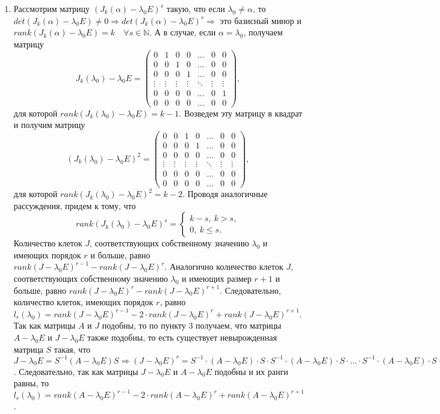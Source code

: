 \begin{Proof}
\begin{enumerate}
		\item Рассмотрим матрицу $(J_k(\alpha) - \lambda_0 E)^s$ такую, что если $\lambda_0 \ne \alpha$, то $det(J_k(\alpha) - \lambda_0 E)\ne 0 \Rightarrow det(J_k(\alpha) - \lambda_0 E)^s\Rightarrow$ это базисный минор и $rank(J_k(\alpha) - \lambda_0 E) = k\quad \forall s \in \mathbb{N}$. А в случае, если $\alpha = \lambda_0$, получаем матрицу $$J_k(\lambda_0) - \lambda_0 E = 
		\begin{pmatrix} 
			0 & 1 & 0 & 0 & \dots & 0 & 0 \\
			0 & 0 & 1 & 0 & \dots & 0 & 0 \\
			0 & 0 & 0 & 1 & \dots & 0 & 0 \\
			\vdots & \vdots & \vdots & \vdots & \ddots & \vdots & \vdots\\
			0 & 0 & 0 & 0 & \dots & 0 & 1 \\
			0 & 0 & 0 & 0 & \dots & 0 & 0
		\end{pmatrix},$$ для которой $rank(J_k(\lambda_0) - \lambda_0 E) = k-1$. Возведем эту матрицу в квадрат и получим матрицу $$(J_k(\lambda_0) - \lambda_0 E)^2 = \begin{pmatrix} 
			0 & 0 & 1 & 0 & \dots & 0 & 0 \\
			0 & 0 & 0 & 1 & \dots & 0 & 0 \\
			0 & 0 & 0 & 0 & \dots & 0 & 0 \\
			\vdots & \vdots & \vdots & \vdots & \ddots & \vdots & \vdots\\
			0 & 0 & 0 & 0 & \dots & 0 & 0 \\
			0 & 0 & 0 & 0 & \dots & 0 & 0
		\end{pmatrix},$$ для которой $rank(J_k(\lambda_0) - \lambda_0 E)^2 = k-2$. Проводя аналогичные рассуждения, придем к тому, что $$rank(J_k(\lambda_0) - \lambda_0 E)^s = \begin{cases}
			k - s,\ k > s,\\
			0,\ k \leqslant s.
		\end{cases}$$
		Количество клеток $J$, соответствующих собственному значению $\lambda_0$ и имеющих порядок $r$ и больше, равно $rank(J-\lambda_0 E)^{r-1} - rank(J-\lambda_0 E)^r$. Аналогично количество клеток $J$, соответствующих собственному значению $\lambda_0$ и имеющих размер $r + 1$ и больше, равно $rank(J-\lambda_0 E)^{r} - rank(J-\lambda_0 E)^{r+1}$. Следовательно, количество клеток, имеющих порядок $r$, равно $l_r(\lambda_0) = rank(J - \lambda_0 E)^{r - 1} - 2\cdot rank(J - \lambda_0 E)^{r} + rank(J - \lambda_0 E)^{r + 1}$.\\
		Так как матрицы $A$ и $J$ подобны, то по пункту 3 получаем, что матрицы $A-\lambda_0 E$ и $J - \lambda_0 E$ также подобны, то есть существует невырожденная матрица $S$ такая, что $J-\lambda_0 E = S^{-1}(A - \lambda_0 E) S\Rightarrow (J-\lambda_0 E)^r = S^{-1}\cdot (A-\lambda_0 E)\cdot S \cdot S^{-1}\cdot (A-\lambda_0 E)\cdot S\cdot \ldots \cdot S^{-1}\cdot (A-\lambda_0 E)\cdot S = S^{-1} (A-\lambda_0 E)^r S$. Следовательно, так как матрицы $J - \lambda_0 E$ и $A - \lambda_0 E$ подобны и их ранги равны, то $l_r(\lambda_0) = rank(A - \lambda_0 E)^{r - 1} - 2\cdot rank(A - \lambda_0 E)^{r} + rank(A - \lambda_0 E)^{r + 1}$.
	\end{enumerate}
\end{Proof}
